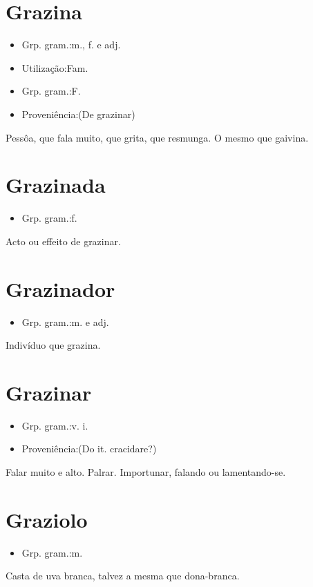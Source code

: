\section{Grazina}
\begin{itemize}
\item {Grp. gram.:m., f.  e  adj.}
\end{itemize}
\begin{itemize}
\item {Utilização:Fam.}
\end{itemize}
\begin{itemize}
\item {Grp. gram.:F.}
\end{itemize}
\begin{itemize}
\item {Proveniência:(De \textunderscore grazinar\textunderscore )}
\end{itemize}
Pessôa, que fala muito, que grita, que resmunga.
O mesmo que \textunderscore gaivina\textunderscore .
\section{Grazinada}
\begin{itemize}
\item {Grp. gram.:f.}
\end{itemize}
Acto ou effeito de grazinar.
\section{Grazinador}
\begin{itemize}
\item {Grp. gram.:m.  e  adj.}
\end{itemize}
Indivíduo que grazina.
\section{Grazinar}
\begin{itemize}
\item {Grp. gram.:v. i.}
\end{itemize}
\begin{itemize}
\item {Proveniência:(Do it. \textunderscore cracidare\textunderscore ?)}
\end{itemize}
Falar muito e alto.
Palrar.
Importunar, falando ou lamentando-se.
\section{Graziolo}
\begin{itemize}
\item {Grp. gram.:m.}
\end{itemize}
Casta de uva branca, talvez a mesma que \textunderscore dona-branca\textunderscore .
